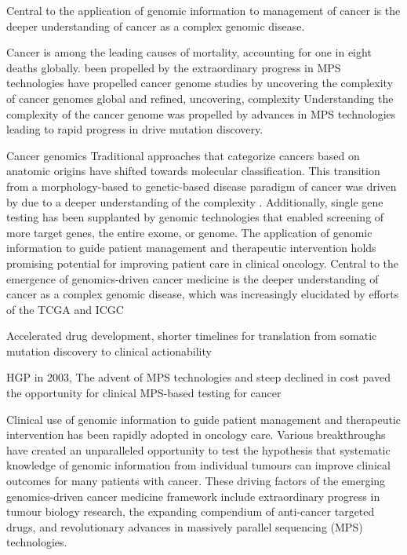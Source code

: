 Central to the application of genomic information to management of cancer is the deeper understanding of cancer as a complex genomic disease.

Cancer is among the leading causes of mortality, accounting for one in eight deaths globally.
been propelled by the extraordinary progress in MPS technologies have propelled cancer genome studies by uncovering the complexity of cancer genomes
global and refined, uncovering, complexity
Understanding the complexity of the cancer genome was propelled by advances in MPS technologies leading to rapid progress in drive mutation discovery.

Cancer genomics Traditional approaches that categorize cancers based on anatomic origins have shifted towards molecular classification. This transition from a morphology-based to genetic-based disease paradigm of cancer was driven by due to a deeper understanding of the complexity . Additionally, single gene testing has been supplanted by genomic technologies that enabled screening of more target genes, the entire exome, or genome. The application of genomic information to guide patient management and therapeutic intervention holds promising potential for improving patient care in clinical oncology. Central to the emergence of genomics-driven cancer medicine is the deeper understanding of cancer as a complex genomic disease, which was increasingly elucidated by efforts of the TCGA and ICGC

Accelerated drug development, shorter timelines for translation from somatic mutation discovery to clinical actionability

HGP in 2003, The advent of MPS technologies and steep declined in cost paved the opportunity for clinical MPS-based testing for cancer



Clinical use of genomic information to guide patient management and therapeutic intervention has been rapidly adopted in oncology care. Various breakthroughs have created an unparalleled opportunity to test the hypothesis that systematic knowledge of genomic information from individual tumours can improve clinical outcomes for many patients with cancer. These driving factors of the emerging genomics-driven cancer medicine framework include extraordinary progress in tumour biology research, the expanding compendium of anti-cancer targeted drugs, and revolutionary advances in massively parallel sequencing (MPS) technologies.

